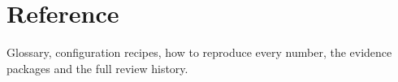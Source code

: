 \section{Reference}\label{sec:h}

Glossary, configuration recipes, how to reproduce every number, the evidence packages and the full review history.









